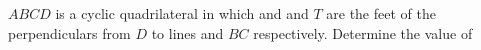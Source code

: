 $ABCD$ is a cyclic quadrilateral in which    and    and $T$ are the feet of the perpendiculars from $D$ to lines   and $BC$ respectively.  Determine the value of 